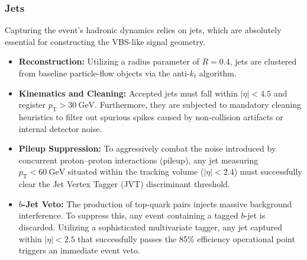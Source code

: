 \subsubsection{Jets}
Capturing the event's hadronic dynamics relies on jets, which are absolutely essential for constructing the VBS-like signal geometry.
\begin{itemize}
    \item \textbf{Reconstruction:} Utilizing a radius parameter of $R=0.4$, jets are clustered from baseline particle-flow objects via the anti-$k_t$ algorithm.
    \item \textbf{Kinematics and Cleaning:} Accepted jets must fall within $|\eta| < 4.5$ and register $p_{\text{T}} > 30~\text{GeV}$. Furthermore, they are subjected to mandatory cleaning heuristics to filter out spurious spikes caused by non-collision artifacts or internal detector noise.
    \item \textbf{Pileup Suppression:} To aggressively combat the noise introduced by concurrent proton--proton interactions (pileup), any jet measuring $p_{\text{T}} < 60~\text{GeV}$ situated within the tracking volume ($|\eta| < 2.4$) must successfully clear the Jet Vertex Tagger (JVT) discriminant threshold.
    \item \textbf{$b$-Jet Veto:} The production of top-quark pairs injects massive background interference. To suppress this, any event containing a tagged $b$-jet is discarded. Utilizing a sophisticated multivariate tagger, any jet captured within $|\eta| < 2.5$ that successfully passes the 85\% efficiency operational point triggers an immediate event veto.
\end{itemize}

